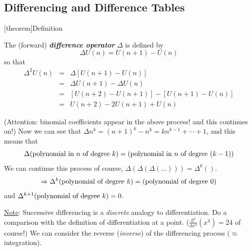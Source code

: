 \documentclass[12pt]{report}
\theoremstyle{definition}
\begin{document}
\subsection{Differencing and Difference Tables}

[theorem]{Definition}
\begin{difference operator}
    The (forward) \textbf{\emph{difference operator}} $\Delta$ is defined by\[
        \Delta U(n) = U(n+1) - U(n)
    \]so that
    \begin{eqnarray*}
        \Delta^{2}U(n) & = & \Delta[U(n + 1) - U(n)] \\
                  & = & \Delta U(n+1) - \Delta U(n) \\
                  & = & [U(n + 2) - U(n + 1)] - [U(n + 1) - U(n)] \\
                  & = & U(n + 2) - 2U(n + 1) + U(n)
    \end{eqnarray*}
    
\end{difference operator}

(Attention: binomial coefficients appear in the above process! and this continues on!)
Now we can see that $\Delta n^{k} = {(n + 1)}^{k} - n^{k} = kn^{k - 1} + \cdots + 1$,
and this means that \[
    \Delta (\textnormal{polynomial in $n$ of degree $k$}) = (\textnormal{polynomial in $n$ of degree ($k -1$)})
\]
We can continue this process of course, $\Delta(\Delta(\Delta(\ldots))) = \Delta^{k}()$.\[
    \Rightarrow{} \Delta^{k} (\textnormal{polynomial of degree $k$}) = (\textnormal{polynomial of degree 0})
\]and $\Delta^{k+1}(\textnormal{polynomial of degree $k$}) = 0$.

\underline{Note}: Successive differencing is a \emph{discrete} analogy to differentiation.
Do a comparison with the definition of differentiation at a point.
($\frac{\mathrm{d}^{4}}{\mathrm{d}x^{4}} (x^{4}) = 24$ of course!)
We can consider the reverse (\emph{inverse}) of the differencing process ($\approx$ integration).
\end{document}
